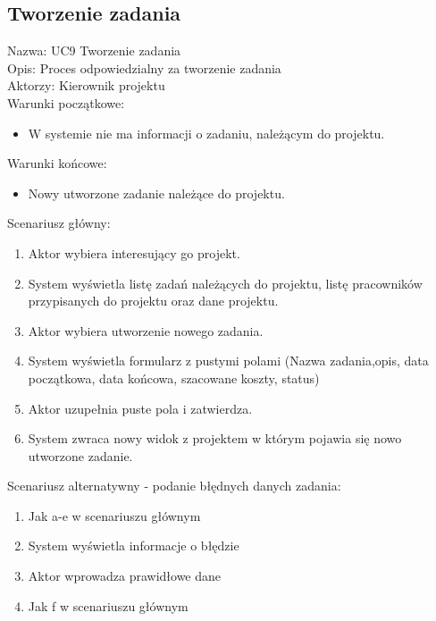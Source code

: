 \subsection{Tworzenie zadania}
\begin{adjustwidth}{5em}{0pt}
Nazwa: UC9 Tworzenie zadania\\
Opis: Proces odpowiedzialny za tworzenie zadania\\
Aktorzy: Kierownik projektu \\
Warunki początkowe:
\begin{itemize}
\item W systemie nie ma informacji o zadaniu, należącym do projektu.
\end{itemize}
Warunki końcowe:
\begin{itemize}
\item Nowy utworzone zadanie należące do projektu.
\end{itemize}
Scenariusz główny:
\begin{enumerate}
\item Aktor wybiera interesujący go projekt.
\item System wyświetla listę zadań należących do projektu, listę pracowników przypisanych do projektu oraz dane projektu.
\item Aktor wybiera utworzenie nowego zadania.
\item System wyświetla formularz z pustymi polami (Nazwa zadania,opis, data początkowa, data końcowa, szacowane koszty, status)
\item Aktor uzupełnia puste pola i zatwierdza.
\item System zwraca nowy widok z projektem w którym pojawia się nowo utworzone zadanie.
\end{enumerate}
Scenariusz alternatywny - podanie błędnych danych zadania: 
\begin{enumerate}
\item Jak a-e w scenariuszu głównym
\item System wyświetla informacje o błędzie
\item Aktor wprowadza prawidłowe dane
\item Jak f w scenariuszu głównym
\end{enumerate}
\end{adjustwidth}

